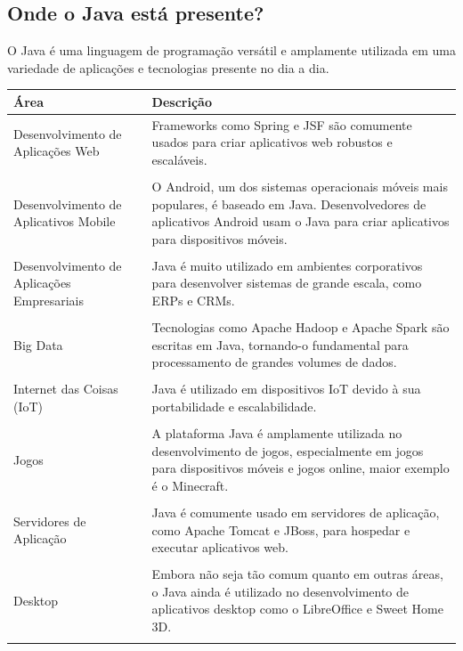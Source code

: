 \documentclass{article}
\begin{document}
\subsection{Onde o Java está presente?}
\justify
O Java é uma linguagem de programação versátil e amplamente utilizada em uma variedade de aplicações e tecnologias presente no dia a dia. \newline

\begin{table}[ht]
    \centering
    \begin{tabularx}{\textwidth}{p{3cm}X}
        \hline
        \textbf{Área} & \textbf{Descrição} \\
        \hline
        	Desenvolvimento de Aplicações Web & Frameworks como Spring e JSF são comumente usados para criar aplicativos web robustos e escaláveis. \\ \\
        	Desenvolvimento de Aplicativos Mobile & O Android, um dos sistemas operacionais móveis mais populares, é baseado em Java. Desenvolvedores de aplicativos Android usam o Java para criar aplicativos para dispositivos móveis. \\ \\
        	Desenvolvimento de Aplicações Empresariais & Java é muito utilizado em ambientes corporativos para desenvolver sistemas de grande escala, como ERPs e CRMs. \\ \\
	Big Data & Tecnologias como Apache Hadoop e Apache Spark são escritas em Java, tornando-o fundamental para processamento de grandes volumes de dados. \\ \\
	Internet das Coisas (IoT) & Java é utilizado em dispositivos IoT devido à sua portabilidade e escalabilidade. \\ \\
	Jogos & A plataforma Java é amplamente utilizada no desenvolvimento de jogos, especialmente em jogos para dispositivos móveis e jogos online, maior exemplo é o Minecraft. \\ \\
	Servidores de Aplicação & Java é comumente usado em servidores de aplicação, como Apache Tomcat e JBoss, para hospedar e executar aplicativos web. \\ \\
	Desktop & Embora não seja tão comum quanto em outras áreas, o Java ainda é utilizado no desenvolvimento de aplicativos desktop como o LibreOffice e Sweet Home 3D. \\	 \\
        \hline
    \end{tabularx}
\end{table}
\end{document}
